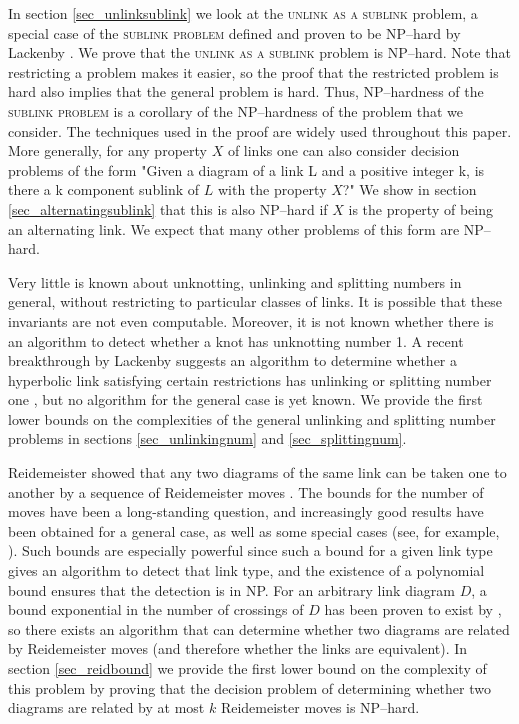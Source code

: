 \documentclass[12pt]{amsart}
\theoremstyle{definition}
\theoremstyle{remark}
\begin{document}
In section \ref{sec_unlinksublink} we look at the \textsc{unlink as a sublink} problem, a special case of the \textsc{sublink problem} defined and proven to be NP--hard by Lackenby \cite{Lackenby1}.
We prove that the \textsc{unlink as a sublink} problem is NP--hard.
Note that restricting a problem makes it easier, so the proof that the restricted problem is hard also implies that the general problem is hard.
Thus, NP--hardness of the \textsc{sublink problem} is a corollary of the NP--hardness of the problem that we consider.
The techniques used in the proof are widely used throughout this paper.
More generally, for any property $X$ of links one can also consider decision problems of the form "Given a diagram of a link L and a positive integer k, is there a k component sublink of $L$ with the property $X$?"  We show in section \ref{sec_alternatingsublink} that this is also NP--hard if $X$ is the property of being an alternating link.
We expect that many other problems of this form are NP--hard.

Very little is known about unknotting, unlinking and splitting numbers in general, without restricting to particular classes of links.
It is possible that these invariants are not even computable.
Moreover, it is not known whether there is an algorithm to detect whether a knot has unknotting number 1.
A recent breakthrough by Lackenby suggests an algorithm to determine whether a hyperbolic link satisfying certain restrictions has unlinking or splitting number one \cite{Lackenby5}, but no algorithm for the general case is yet known.
We provide the first lower bounds on the complexities of the general unlinking and splitting number problems in sections \ref{sec_unlinkingnum} and \ref{sec_splittingnum}.

Reidemeister showed that any two diagrams of the same link can be taken one to another by a sequence of Reidemeister moves \cite{Reidemeister1}.
The bounds for the number of moves have been a long-standing question, and increasingly good results have been obtained for a general case, as well as some special cases (see, for example, \cite{HassLagariasPippenger1,Lackenby2,Lackenby4}).
Such bounds are especially powerful since such a bound for a given link type gives an algorithm to detect that link type, and the existence of a polynomial bound ensures that the detection is in NP.
For an arbitrary link diagram $D$, a bound exponential in the number of crossings of $D$ has been proven to exist by \cite{CowardLackenby1}, so there exists an algorithm that can determine whether two diagrams are related by Reidemeister moves (and therefore whether the links are equivalent).
In section \ref{sec_reidbound} we provide the first lower bound on the complexity of this problem by proving that the decision problem of determining whether two diagrams are related by at most $k$ Reidemeister moves is NP--hard.
\end{document}
